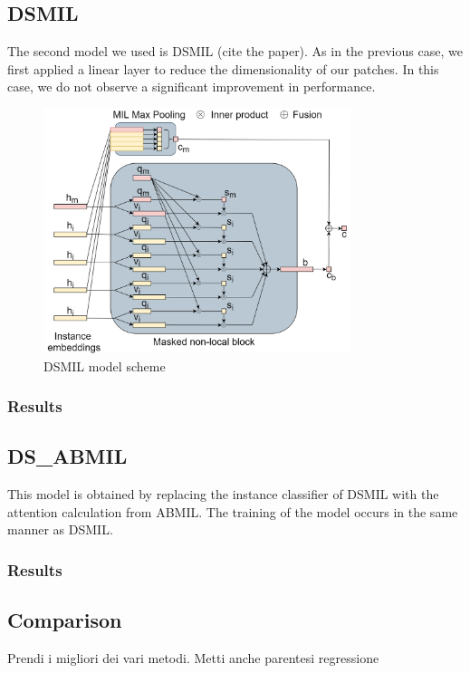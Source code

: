 \documentclass{article}
\begin{document}
\subsection{DSMIL}
The second model we used is DSMIL (cite the paper). As in the previous case, we first applied a linear layer to reduce the dimensionality of our patches. In this case, we do not observe a significant improvement in performance.
\begin{figure}[h]
	\centering
	\includegraphics[width=0.8\textwidth]{images/dsmil.png}
	\caption{DSMIL model scheme}
\end{figure}

\subsubsection{Results}

\subsection{DS\_ABMIL}
This model is obtained by replacing the instance classifier of DSMIL with the attention calculation from ABMIL. The training of the model occurs in the same manner as DSMIL.

\subsubsection{Results}

\subsection{Comparison}

Prendi i migliori dei vari metodi.
Metti anche parentesi regressione
\end{document}
